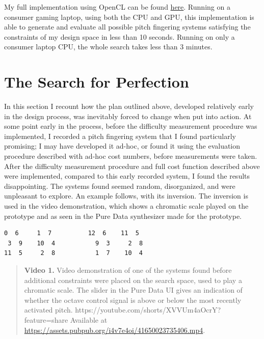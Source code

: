 \documentclass[sigconf]{nimeart}
\begin{document}
My full implementation using OpenCL can be found \href{https://github.com/DocSunset/pitch-fingering-brute}{here}. Running on a consumer gaming laptop, using both the CPU and GPU, this implementation is able to generate and evaluate all possible pitch fingering systems satisfying the constraints of my design space in less than 10 seconds. Running on only a consumer laptop CPU, the whole search takes less than 3 minutes.

\section{The Search for Perfection}\label{the-search-for-perfection}

In this section I recount how the plan outlined above, developed relatively early in the design process, was inevitably forced to change when put into action. At some point early in the process, before the difficulty measurement procedure was implemented, I recorded a pitch fingering system that I found particularly promising; I may have developed it ad-hoc, or found it using the evaluation procedure described with ad-hoc cost numbers, before measurements were taken. After the difficulty measurement procedure and full cost function described above were implemented, compared to this early recorded system, I found the results disappointing. The systems found seemed random, disorganized, and were unpleasant to explore. An example follows, with its inversion. The inversion is used in the video demonstration, which shows a chromatic scale played on the prototype and as seen in the Pure Data synthesizer made for the prototype.

\begin{Verbatim}[breaklines=true,breakanywhere=true,fontsize=\footnotesize]
 0  6     1  7          12  6    11  5
 3  9    10  4           9  3     2  8
11  5     2  8           1  7    10  4
\end{Verbatim}


\begin{quote}\small\textbf{Video 1.} Video demonstration of one of the systems found before additional constraints were placed on the search space, used to play a chromatic scale. The slider in the Pure Data UI gives an indication of whether the octave control signal is above or below the most recently activated pitch. https://youtube.com/shorts/XVVUm4aOcrY?feature=share Available at \url{https://assets.pubpub.org/i4v7e4oi/41650023735406.mp4}.\end{quote}
\end{document}
